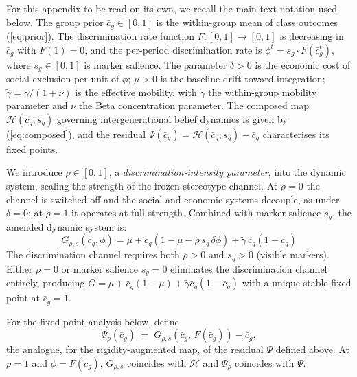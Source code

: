 \documentclass[pdflatex,sn-basic]{sn-jnl}
\theoremstyle{thmstyleone}
\numberwithin{proposition}{subsection}
\begin{document}
For this appendix to be read on its own, we recall the main-text
notation used below. The group prior $\bar{c}_g \in [0,1]$ is the
within-group mean of class outcomes (\ref{eq:prior}). The
discrimination rate function $F: [0,1] \to [0,1]$ is decreasing in
$\bar{c}_g$ with $F(1) = 0$, and the per-period discrimination rate
is $\phi^t = s_g \cdot F(\bar{c}_g^t)$, where $s_g \in [0,1]$ is
marker salience. The parameter $\delta > 0$ is the economic cost of
social exclusion per unit of $\phi$; $\mu > 0$ is the baseline drift
toward integration; $\tilde{\gamma} = \gamma/(1+\nu)$ is the
effective mobility, with $\gamma$ the within-group mobility
parameter and $\nu$ the Beta concentration parameter. The composed
map $\mathcal{H}(\bar{c}_g; s_g)$ governing intergenerational belief
dynamics is given by (\ref{eq:composed}), and the residual
$\Psi(\bar{c}_g) = \mathcal{H}(\bar{c}_g; s_g) - \bar{c}_g$
characterises its fixed points.

We introduce $\rho \in [0,1]$, a \emph{discrimination-intensity
parameter}, into the dynamic system, scaling the strength of the
frozen-stereotype channel. At $\rho = 0$ the channel is switched off and
the social and economic systems decouple, as under $\delta = 0$; at
$\rho = 1$ it operates at full strength. Combined with marker salience
$s_g$, the amended dynamic system is:
\begin{equation}
  G_{\rho,s}(\bar{c}_g, \phi) = \mu + \bar{c}_g(1 - \mu - \rho\, s_g\, \delta \phi)
  + \tilde{\gamma}\,\bar{c}_g(1-\bar{c}_g)
  \label{eq:loury-rho}
\end{equation}
The discrimination channel requires both $\rho > 0$ and $s_g > 0$
(visible markers). Either $\rho = 0$ or
marker salience $s_g = 0$ eliminates the discrimination channel entirely, producing
$G = \mu + \bar{c}_g(1-\mu) + \tilde{\gamma}\bar{c}_g(1-\bar{c}_g)$
with a unique stable fixed point at $\bar{c}_g = 1$.

For the fixed-point analysis below, define
\begin{equation}
  \Psi_\rho(\bar{c}_g) \;=\; G_{\rho,s}(\bar{c}_g,\, F(\bar{c}_g)) - \bar{c}_g,
  \label{eq:psi-rho}
\end{equation}
the analogue, for the rigidity-augmented map, of the residual $\Psi$
defined above. At $\rho = 1$ and $\phi = F(\bar{c}_g)$, $G_{\rho,s}$
coincides with $\mathcal{H}$ and $\Psi_\rho$ coincides with $\Psi$.
\end{document}

